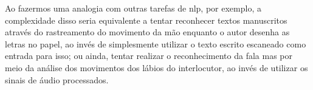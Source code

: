 







Ao fazermos uma analogia com outras tarefas de \acrshort{nlp}, por exemplo, a complexidade disso seria equivalente a tentar reconhecer textos manuscritos através do rastreamento do movimento da mão enquanto o autor desenha as letras no papel, ao invés de simplesmente utilizar o texto escrito escaneado como entrada para isso; ou ainda, tentar realizar o reconhecimento da fala mas por meio da análise dos movimentos dos lábios do interlocutor, ao invés de utilizar os sinais de áudio processados. 



